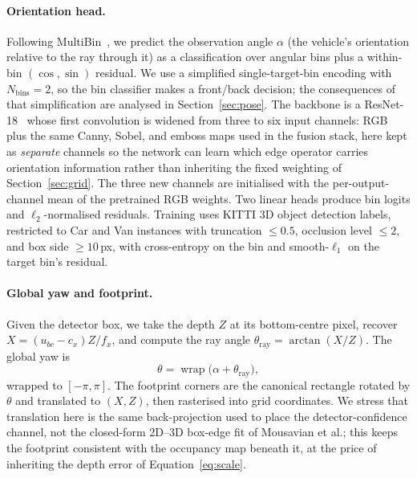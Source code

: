 \documentclass[sigconf]{acmart}
\newcommand{\rev}[1]{{\color{revcolor}#1}}
\begin{document}
\paragraph{Orientation head.} Following MultiBin~\cite{mousavian2017multibin}, we predict the observation angle $\alpha$ (the vehicle's orientation relative to the ray through it) as a classification over angular bins plus a within-bin $(\cos,\sin)$ residual. We use a simplified single-target-bin encoding with $N_{\text{bins}} = 2$\rev{, so the bin classifier makes a front/back decision}; the consequences of that simplification are analysed in Section~\ref{sec:pose}. The backbone is a ResNet-18~\cite{he2016resnet} whose first convolution is widened from three to six input channels: RGB plus the same Canny, Sobel, and emboss maps used in the fusion stack, here kept as \emph{separate} channels so the network can learn which edge operator carries orientation information rather than inheriting the fixed weighting of Section~\ref{sec:grid}. The three new channels are initialised with the per-output-channel mean of the pretrained RGB weights. Two linear heads produce bin logits and $\ell_2$-normalised residuals. Training uses KITTI 3D object detection labels, restricted to Car and Van instances with truncation $\leq 0.5$, occlusion level $\leq 2$, and box side $\geq 10$\,px, with cross-entropy on the bin and smooth-$\ell_1$ on the target bin's residual.

\paragraph{Global yaw and footprint.} Given the detector box, we take the depth $Z$ at its bottom-centre pixel, recover $X = (u_{bc} - c_x)Z/f_x$, and compute the ray angle $\theta_{\text{ray}} = \arctan(X/Z)$. The global yaw is
\begin{equation}\label{eq:yaw}
\theta = \operatorname{wrap}\big(\alpha + \theta_{\text{ray}}\big),
\end{equation}
wrapped to $[-\pi, \pi]$. The footprint corners are the canonical rectangle rotated by $\theta$ and translated to $(X,Z)$, then rasterised into grid coordinates. We stress that translation here is the same back-projection used to place the detector-confidence channel, not the closed-form 2D--3D box-edge fit of Mousavian et al.; this keeps the footprint consistent with the occupancy map beneath it, at the price of inheriting the depth error of Equation~\eqref{eq:scale}.

\end{document}
